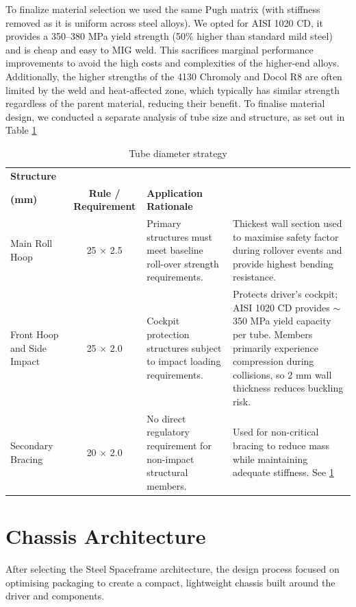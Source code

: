 \documentclass[11pt, a4paper]{report}
\numberwithin{equation}{section}
\begin{document}
\begin{refsection}
To finalize material selection we used the same Pugh matrix (with stiffness removed as it is uniform across steel alloys). We opted for AISI 1020 CD, it provides a 350--380 MPa yield strength (50\% higher than standard mild steel) and is cheap and easy to MIG weld. This sacrifices marginal performance improvements to avoid the high costs and complexities of the higher-end alloys. Additionally, the higher strengths of the 4130 Chromoly and Docol R8 are often limited by the weld and heat-affected zone, which typically has similar strength regardless of the parent material, reducing their benefit. To finalise material design, we conducted a separate analysis of tube size and structure, as set out in Table \ref{tab:tube_diameter_strategy}

\begin{table}[h]
    \centering
    \caption{Tube diameter strategy}
    \label{tab:tube_diameter_strategy}
    \footnotesize
    \begin{tabular}{|p{2.75cm}|c|p{4.2cm}|p{6.2cm}|}
        \hline
        \textbf{Structure} & \makecell{\textbf{Tube Size} \\ \textbf{(mm)}} & \textbf{Rule / Requirement} & \textbf{Application Rationale} \\
        \hline
        Main Roll Hoop & 25 $\times$ 2.5 & Primary structures must meet baseline roll-over strength requirements. & Thickest wall section used to maximise safety factor during rollover events and provide highest bending resistance. \\
        \hline
        Front Hoop and Side Impact & 25 $\times$ 2.0 & Cockpit protection structures subject to impact loading requirements. & Protects driver's cockpit; AISI 1020 CD provides $\sim$350 MPa yield capacity per tube. Members primarily experience compression during collisions, so 2 mm wall thickness reduces buckling risk. \\
        \hline
        Secondary Bracing & 20 $\times$ 2.0 & No direct regulatory requirement for non-impact structural members. & Used for non-critical bracing to reduce mass while maintaining adequate stiffness. See \ref{sec:chassis_architecture} \\
        \hline
    \end{tabular}
\end{table}
\vspace{-16pt}

\section{Chassis Architecture}
\label{sec:chassis_architecture}
After selecting the Steel Spaceframe architecture, the design process focused on optimising packaging to create a compact, lightweight chassis built around the driver and components.


\end{refsection}
\end{document}
